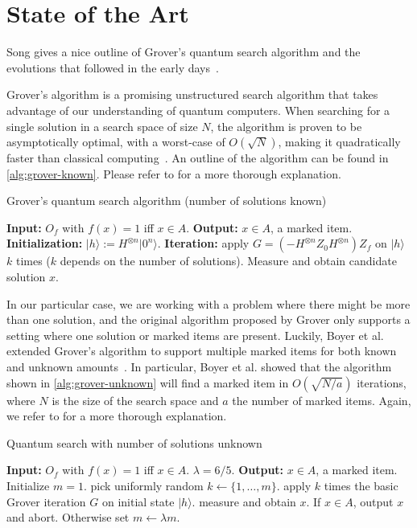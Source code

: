 \section{State of the Art}\label{sec:state-of-the-art}

Song gives a nice outline of Grover's quantum search algorithm and the evolutions that followed in the early days~\cite{song2017early}.

Grover's algorithm is a promising unstructured search algorithm that takes advantage of our understanding of quantum computers.
When searching for a single solution in a search space of size $N$, the algorithm is proven to be asymptotically optimal, with a worst-case of $O\left(\sqrt{N}\right)$, making it quadratically faster than classical computing~\cite{grover1996fast}.
An outline of the algorithm can be found in \autoref{alg:grover-known}.
Please refer to \cite{song2017early} for a more thorough explanation.

\begin{algorithm}
\caption{Grover's quantum search algorithm (number of solutions known)~\cite{song2017early}}
\begin{algorithmic}[1]
\State \textbf{Input:} $O_f$ with $f(x) = 1$ iff $x \in A$.
\State \textbf{Output:} $x \in A$, a marked item.
\State \textbf{Initialization:} $\lvert h \rangle := H^{\otimes n} \lvert 0^n \rangle$.
\State \textbf{Iteration:} apply $G = (-H^{\otimes n} Z_0 H^{\otimes n}) Z_f$ on $\lvert h \rangle$ $k$ times ($k$ depends on the number of solutions).
\State Measure and obtain candidate solution $x$.
\end{algorithmic}
\end{algorithm}\label{alg:grover-known}

In our particular case, we are working with a problem where there might be more than one solution, and the original algorithm proposed by Grover only supports a setting where one solution or marked items are present.
Luckily, Boyer et al. extended Grover's algorithm to support multiple marked items for both known and unknown amounts~\cite{boyer1998tight}.
In particular, Boyer et al. showed that the algorithm shown in \ref{alg:grover-unknown} will find a marked item in $O(\sqrt{N/a})$ iterations, where $N$ is the size of the search space and $a$ the number of marked items.
Again, we refer to \cite{song2017early} for a more thorough explanation.

\begin{algorithm}
\caption{Quantum search with number of solutions unknown~\cite{song2017early}}
\begin{algorithmic}[1]
\State \textbf{Input:} $O_f$ with $f(x) = 1$ iff $x \in A$. $\lambda = 6/5$.
\State \textbf{Output:} $x \in A$, a marked item.
\State Initialize $m = 1$.
    \State pick uniformly random $k \leftarrow \{1, \ldots, m\}$.
    \State apply $k$ times the basic Grover iteration $G$ on initial state $\lvert h \rangle$.
    \State measure and obtain $x$. If $x \in A$, output $x$ and abort. Otherwise set $m \leftarrow \lambda m$.
\EndWhile
\end{algorithmic}
\end{algorithm}\label{alg:grover-unknown}
